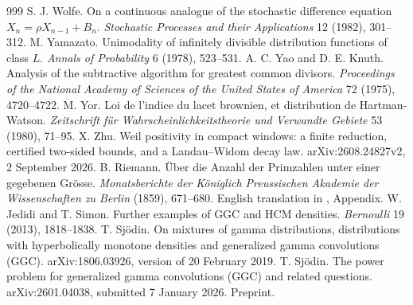 \begin{thebibliography}{999}
 S. J. Wolfe. On a continuous analogue of the stochastic difference equation $X_n=\rho X_{n-1}+B_n$. \emph{Stochastic Processes and their Applications} 12 (1982), 301--312.
 M. Yamazato. Unimodality of infinitely divisible distribution functions of class $L$. \emph{Annals of Probability} 6 (1978), 523--531.
 A. C. Yao and D. E. Knuth. Analysis of the subtractive algorithm for greatest common divisors. \emph{Proceedings of the National Academy of Sciences of the United States of America} 72 (1975), 4720--4722.
 M. Yor. Loi de l'indice du lacet brownien, et distribution de Hartman-Watson. \emph{Zeitschrift f\"ur Wahrscheinlichkeitstheorie und Verwandte Gebiete} 53 (1980), 71--95.
 X. Zhu. Weil positivity in compact windows: a finite reduction, certified two-sided bounds, and a Landau--Widom decay law. arXiv:2608.24827v2, 2 September 2026.
 B. Riemann. \"Uber die Anzahl der Primzahlen unter einer gegebenen Gr\"osse. \emph{Monatsberichte der K\"oniglich Preussischen Akademie der Wissenschaften zu Berlin} (1859), 671--680. English translation in \cite{Edwards}, Appendix. %
 W. Jedidi and T. Simon. Further examples of GGC and HCM densities. \emph{Bernoulli} 19 (2013), 1818--1838. %
 T. Sj\"odin. On mixtures of gamma distributions, distributions with hyperbolically monotone densities and generalized gamma convolutions (GGC). arXiv:1806.03926, version of 20 February 2019. %
 T. Sj\"odin. The power problem for generalized gamma convolutions (GGC) and related questions. arXiv:2601.04038, submitted 7 January 2026. Preprint. %

\end{thebibliography}
